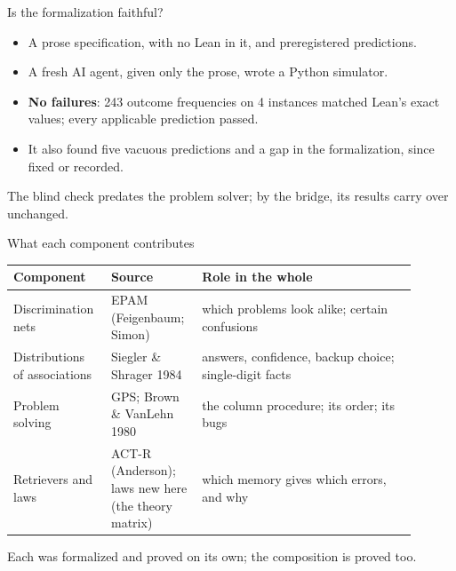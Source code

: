\documentclass[aspectratio=169,11pt]{beamer}
\begin{document}
\begin{frame}{Is the formalization faithful?}
  \begin{itemize}
    \item A prose specification, with no Lean in it, and preregistered predictions.
    \item A fresh AI agent, given only the prose, wrote a Python simulator.
    \item \textbf{No failures}: 243 outcome frequencies on 4 instances matched Lean's exact values; every applicable prediction passed.
    \item It also found five vacuous predictions and a gap in the formalization, since fixed or recorded.
  \end{itemize}
  \medskip
  The blind check predates the problem solver; by the bridge, its results carry over unchanged.
\end{frame}

\begin{frame}{What each component contributes}
  \footnotesize
  \begin{tabular}{p{0.2\linewidth}p{0.2\linewidth}p{0.5\linewidth}}
    \toprule
    Component & Source & Role in the whole\\
    \midrule
    Discrimination nets & EPAM (Feigenbaum; Simon) & which problems look alike; certain confusions\\
    Distributions of associations & Siegler \& Shrager 1984 & answers, confidence, backup choice; single-digit facts\\
    Problem solving & GPS; Brown \& VanLehn 1980 & the column procedure; its order; its bugs\\
    Retrievers and laws & ACT-R (Anderson); laws new here (the theory matrix) & which memory gives which errors, and why\\
    \bottomrule
  \end{tabular}
  \bigskip

  \normalsize
  Each was formalized and proved on its own; the composition is proved too.
\end{frame}
\end{document}
